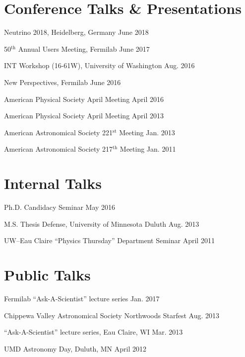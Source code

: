 \documentclass[11pt]{cv}
\begin{document}
\begin{cv}
\section{Conference Talks \& Presentations}
\begin{etaremune}
  \item Neutrino 2018, Heidelberg, Germany \hfill June 2018
  \item 50$^{\text{th}}$ Annual Users Meeting, Fermilab \hfill June 2017
  \item INT Workshop (16-61W), University of Washington \hfill Aug. 2016
  \item New Perspectives, Fermilab \hfill June 2016
  \item American Physical Society April Meeting \hfill April 2016
  \item American Physical Society April Meeting \hfill April 2013
  \item American Astronomical Society 221${^\text{st}}$ Meeting \hfill Jan. 2013
  \item American Astronomical Society 217${^\text{th}}$ Meeting \hfill Jan. 2011
\end{etaremune}


\section{Internal Talks}
\begin{etaremune}
  \item Ph.D. Candidacy Seminar \hfill May 2016
  \item M.S. Thesis Defense, University of Minnesota Duluth \hfill Aug. 2013
  \item UW--Eau Claire ``Physics Thursday'' Department Seminar \hfill April 2011
\end{etaremune}


\section{Public Talks}
\begin{etaremune}
  \item Fermilab ``Ask-A-Scientist'' lecture series \hfill Jan. 2017
  \item Chippewa Valley Astronomical Society Northwoods Starfest \hfill Aug. 2013
  \item ``Ask-A-Scientist'' lecture series, Eau Claire, WI \hfill Mar. 2013
  \item UMD Astronomy Day, Duluth, MN \hfill April 2012
\end{etaremune}



\end{cv}
\end{document}
